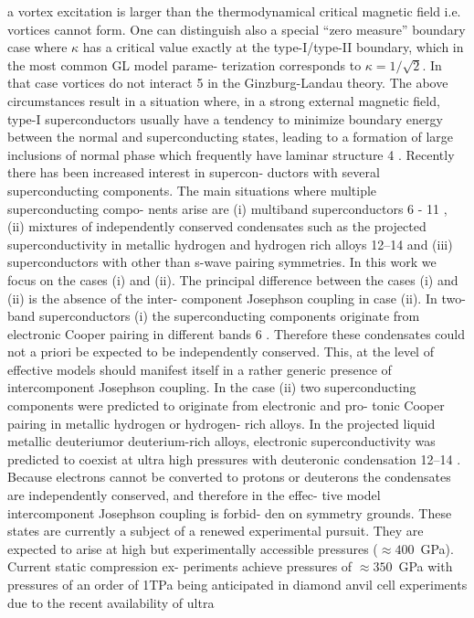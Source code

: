 a vortex excitation is larger than the thermodynamical
critical magnetic field i.e. vortices cannot form. One can
distinguish also a special “zero measure” boundary case
where \( \kappa \) has a critical value exactly at the type-I/type-II
boundary, which in the most common GL model parame-
terization corresponds to \( \kappa = 1/\sqrt{2} \). In that case vortices
do not interact 5 in the Ginzburg-Landau theory.
The above circumstances result in a situation where, in
a strong external magnetic field, type-I superconductors
usually have a tendency to minimize boundary energy
between the normal and superconducting states, leading
to a formation of large inclusions of normal phase which
frequently have laminar structure 4 .
Recently there has been increased interest in supercon-
ductors with several superconducting components. The
main situations where multiple superconducting compo-
nents arise are (i) multiband superconductors 6 - 11 , (ii)
mixtures of independently conserved condensates such as
the projected superconductivity in metallic hydrogen and
hydrogen rich alloys 12–14 and (iii) superconductors with
other than s-wave pairing symmetries. In this work we
focus on the cases (i) and (ii). The principal difference
between the cases (i) and (ii) is the absence of the inter-
component Josephson coupling in case (ii).
In two-band superconductors (i) the superconducting
components originate from electronic Cooper pairing in
different bands 6 . Therefore these condensates could not a
priori be expected to be independently conserved. This,
at the level of effective models should manifest itself in
a rather generic presence of intercomponent Josephson
coupling.
In the case (ii) two superconducting components
were predicted to originate from electronic and pro-
tonic Cooper pairing in metallic hydrogen or hydrogen-
rich alloys. In the projected liquid metallic deuteriumor deuterium-rich alloys, electronic superconductivity
was predicted to coexist at ultra high pressures with
deuteronic condensation 12–14 . Because electrons cannot
be converted to protons or deuterons the condensates
are independently conserved, and therefore in the effec-
tive model intercomponent Josephson coupling is forbid-
den on symmetry grounds. These states are currently
a subject of a renewed experimental pursuit. They are
expected to arise at high but experimentally accessible
pressures (\( \approx 400 \)~GPa). Current static compression ex-
periments achieve pressures of \( \approx 350 \)~GPa with pressures
of an order of 1TPa being anticipated in diamond anvil
cell experiments due to the recent availability of ultra
